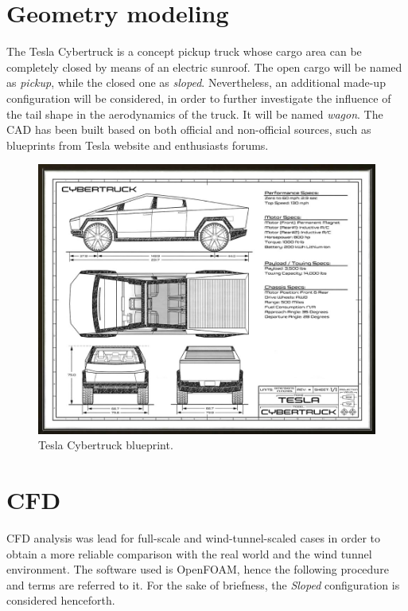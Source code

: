 \documentclass{elbioimp2}
\begin{document}
\section{Geometry modeling}
The Tesla Cybertruck is a concept pickup truck whose cargo area can be completely closed by means of an electric sunroof. The open cargo will be named as \emph{pickup}, while the closed one as \emph{sloped}. Nevertheless, an additional made-up configuration will be considered, in order to further investigate the influence of the tail shape in the aerodynamics of the truck. It will be named \emph{wagon}. The CAD has been built based on both official and non-official sources, such as blueprints from Tesla website and enthusiasts forums.
\begin{figure}[htp]
  \centering
  \includegraphics[width=0.9\columnwidth]{blueprint}
  \caption{Tesla Cybertruck blueprint.\label{Blueprint}}
\end{figure}

\section{CFD}
CFD analysis was lead for full-scale and wind-tunnel-scaled cases in order to obtain a more reliable comparison with the real world and the wind tunnel environment. The software used is OpenFOAM, hence the following procedure and terms are referred to it. For the sake of briefness, the \emph{Sloped} configuration is considered henceforth. 
\end{document}
